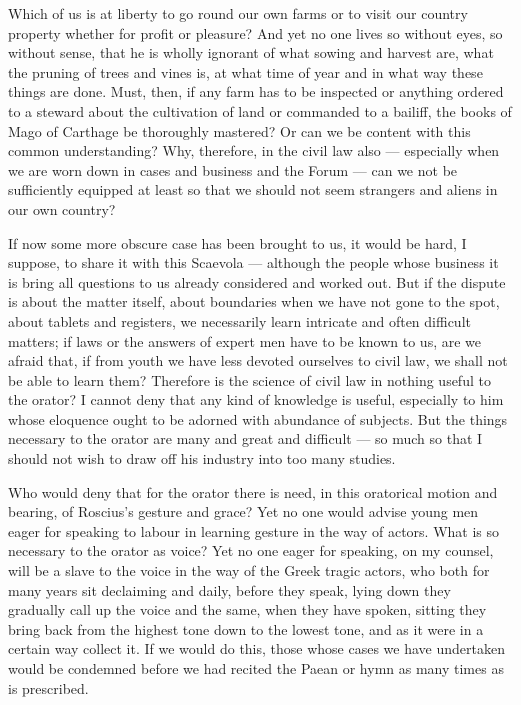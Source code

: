  Which of us is at liberty to go round our own farms or to visit our country property whether for profit or pleasure? And yet no one lives so without eyes, so without sense, that he is wholly ignorant of what sowing and harvest are, what the pruning of trees and vines is, at what time of year and in what way these things are done. Must, then, if any farm has to be inspected or anything ordered to a steward about the cultivation of land or commanded to a bailiff, the books of Mago of Carthage be thoroughly mastered? Or can we be content with this common understanding? Why, therefore, in the civil law also — especially when we are worn down in cases and business and the Forum — can we not be sufficiently equipped at least so that we should not seem strangers and aliens in our own country?

 If now some more obscure case has been brought to us, it would be hard, I suppose, to share it with this Scaevola — although the people whose business it is bring all questions to us already considered and worked out. But if the dispute is about the matter itself, about boundaries when we have not gone to the spot, about tablets and registers, we necessarily learn intricate and often difficult matters; if laws or the answers of expert men have to be known to us, are we afraid that, if from youth we have less devoted ourselves to civil law, we shall not be able to learn them? Therefore is the science of civil law in nothing useful to the orator? I cannot deny that any kind of knowledge is useful, especially to him whose eloquence ought to be adorned with abundance of subjects. But the things necessary to the orator are many and great and difficult — so much so that I should not wish to draw off his industry into too many studies.

 Who would deny that for the orator there is need, in this oratorical motion and bearing, of Roscius's gesture and grace? Yet no one would advise young men eager for speaking to labour in learning gesture in the way of actors. What is so necessary to the orator as voice? Yet no one eager for speaking, on my counsel, will be a slave to the voice in the way of the Greek tragic actors, who both for many years sit declaiming and daily, before they speak, lying down they gradually call up the voice and the same, when they have spoken, sitting they bring back from the highest tone down to the lowest tone, and as it were in a certain way collect it. If we would do this, those whose cases we have undertaken would be condemned before we had recited the Paean or hymn as many times as is prescribed.

